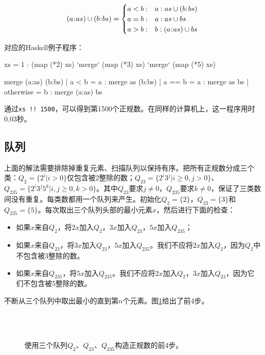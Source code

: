 \documentclass[b5paper]{ctexart}
\begin{document}
\[
(a \cons as) \cup (b \cons bs) = \begin{cases}
  a < b: & a : as \cup (b \cons bs) \\
  a = b: & a : as \cup bs \\
  a > b: & b : (a \cons as) \cup bs \\
\end{cases}
\]

对应的Haskell例子程序：
\begin{Haskell}
xs = 1 : (map (*2) xs) `merge` (map (*3) xs) `merge` (map (*5) xs)

merge (a:as) (b:bs) | a < b = a : merge as (b:bs)
                    | a == b = a : merge as bs
                    | otherwise = b : merge (a:as) bs
\end{Haskell}

通过\texttt{xs !! 1500}，可以得到第1500个正规数。在同样的计算机上，这一程序用时0.03秒。

\subsection*{队列}
上面的解法需要排除掉重复元素、扫描队列以保持有序。把所有正规数分成三个类：$Q_2 = \{2^i | i > 0\}$仅包含被2整除的数；$Q_{23} = \{ 2^i3^j | i \geq 0, j > 0 \}$、$Q_{235} = \{ 2^i3^j5^k | i,j \geq 0, k > 0\}$。其中$Q_{23}$要求$j \neq 0$，$Q_{235}$要求$k \neq 0$，保证了三类数间没有重复。每类数都用一个队列来产生。初始化$Q_2=\{ 2 \}$，$Q_{23} = \{ 3 \}$和$Q_{235} = \{ 5 \}$。每次取出三个队列头部的最小元素$x$，然后进行下面的检查：

\begin{itemize}
\item 如果$x$来自$Q_2$，将$2x$加入$Q_2$，$3x$加入$Q_{23}$，$5x$加入$Q_{235}$；
\item 如果$x$来自$Q_{23}$，将$3x$加入$Q_{23}$，$5x$加入$Q_{235}$。我们不应将$2x$加入$Q_2$，因为$Q_2$中不包含被3整除的数。
\item 如果$x$来自$Q_{235}$，将$5x$加入$Q_{235}$。我们不应将$2x$加入$Q_2$，$3x$加入$Q_{23}$，因为它们不包含被5整除的数。
\end{itemize}

不断从三个队列中取出最小的直到第$n$个元素。图\ref{fig:q235}给出了前4步。

\begin{figure}[htbp]
  \centering
   \\
   \\
  \caption{使用三个队列$Q_2$、$Q_{23}$、$Q_{235}$构造正规数的前4步。}
  \label{fig:q235}
\end{figure}
\end{document}
